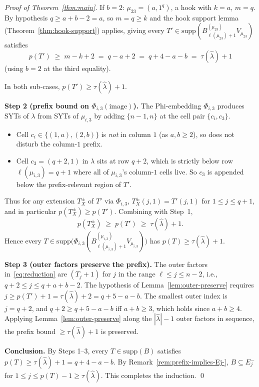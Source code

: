 \documentclass[11pt]{article}
\theoremstyle{definition}
\newcommand{\hatl}{\widehat\lambda}
\newcommand{\supp}{\mathrm{supp}}
\begin{document}
\begin{proof}[Proof of Theorem~\ref{thm:main}]
\textbullet\quad If $b = 2$: $\mu_{23} = (a, 1^q)$, a hook with
$k = a$, $m = q$.  By hypothesis $q \ge a + b - 2 = a$, so $m = q
\ge k$ and the hook support lemma (Theorem~\ref{thm:hook-support})
applies, giving every $T' \in \supp(B^{(\mu_{23})}_{\ell(\mu_{23})+1}
V_{\mu_{23}})$ satisfies
\[
   p(T') \;\ge\; m - k + 2 \;=\; q - a + 2 \;=\; q + 4 - a - b
   \;=\; \tau(\hatl) + 1
\]
(using $b = 2$ at the third equality).

In both sub-cases, $p(T') \ge \tau(\hatl) + 1$.

\medskip\textbf{Step 2 (prefix bound on $\Phi_{i,3}(\text{image})$).}
The Phi-embedding $\Phi_{i,3}$ produces SYTs of $\lambda$ from SYTs of
$\mu_{i,3}$ by adding $\{n-1, n\}$ at the cell pair $\{c_i, c_3\}$.
\begin{itemize}[topsep=0.2em,itemsep=0.1em]
\item Cell $c_i \in \{(1, a), (2, b)\}$ is \emph{not} in column $1$
   (as $a, b \ge 2$), so does not disturb the column-$1$ prefix.
\item Cell $c_3 = (q+2, 1)$ in $\lambda$ sits at row $q + 2$, which
   is strictly below row $\ell(\mu_{i,3}) = q + 1$ where all of
   $\mu_{i,3}$'s column-$1$ cells live.  So $c_3$ is appended below
   the prefix-relevant region of $T'$.
\end{itemize}
Thus for any extension $T_X^\pm$ of $T'$ via $\Phi_{i,3}$,
$T_X^\pm(j, 1) = T'(j, 1)$ for $1 \le j \le q + 1$, and in particular
$p(T_X^\pm) \ge p(T')$.  Combining with Step~1,
\[
   p(T_X^\pm) \;\ge\; p(T') \;\ge\; \tau(\hatl) + 1.
\]
Hence every $T \in \supp\bigl(\Phi_{i,3}(B^{(\mu_{i,3})}_{\ell(\mu_{i,3})+1}
V_{\mu_{i,3}})\bigr)$ has $p(T) \ge \tau(\hatl) + 1$.

\medskip\textbf{Step 3 (outer factors preserve the prefix).}
The outer factors in~\eqref{eq:reduction} are $(T_j + 1)$ for $j$ in
the range $\ell \le j \le n - 2$, i.e., $q + 2 \le j \le q + a + b - 2$.
The hypothesis of Lemma~\ref{lem:outer-preserve} requires
$j \ge p(T') + 1 = \tau(\hatl) + 2 = q + 5 - a - b$.  The smallest
outer index is $j = q + 2$, and $q + 2 \ge q + 5 - a - b$ iff
$a + b \ge 3$, which holds since $a + b \ge 4$.  Applying
Lemma~\ref{lem:outer-preserve} along the $|\hatl| - 1$ outer factors
in sequence, the prefix bound $\ge \tau(\hatl) + 1$ is preserved.

\medskip\textbf{Conclusion.}  By Steps 1--3, every $T \in \supp(B)$
satisfies $p(T) \ge \tau(\hatl) + 1 = q + 4 - a - b$.  By
Remark~\ref{rem:prefix-implies-Ej-}, $B \subseteq E_j^-$ for
$1 \le j \le p(T) - 1 \ge \tau(\hatl)$.  This completes the induction.
\qed
\end{proof}
\end{document}
